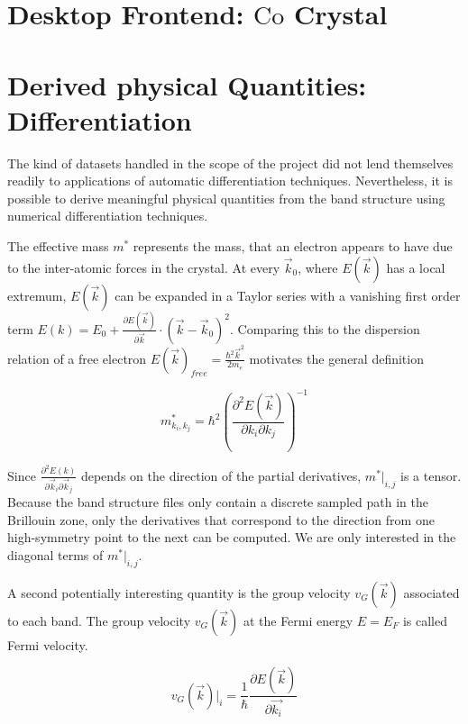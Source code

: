 \section{Desktop Frontend: $\textrm{Co}$ Crystal}



\section{Derived physical Quantities: Differentiation}
The kind of datasets handled in the scope of the project did not lend themselves
readily to applications of automatic differentiation techniques. Nevertheless,
it is possible to derive meaningful physical quantities from the band structure
using numerical differentiation techniques.

The effective mass $m^{*}$ represents the mass, that an electron appears to have due to the inter-atomic forces in the crystal. At every $\vec{k}_0$, where $E(\vec{k})$ has a local extremum, $E(\vec{k})$ can be expanded in a Taylor series with a vanishing first order term $E(k) = E_0 + \frac{\partial E(\vec{k})}{\partial \vec{k}} \cdot (\vec{k}-\vec{k}_0)^2$. Comparing this to the dispersion relation of a free electron $E(\vec{k})_{free} = \frac{\hbar^2 \vec{k}^2}{2 m_e}$ motivates the general definition 

\begin{equation}
    m^{*}_{k_i,k_j} = \hbar^2  \left(\frac{\partial^2E(\vec{k})}{\partial k_i \partial k_j}\right)^{-1}
\end{equation}

Since $\frac{\partial^2E(k)}{\partial \vec{k}_i \partial \vec{k}_j}$ depends on the direction of the partial derivatives, $m^{*}\big|_{i,j}$ is a tensor. Because the band structure files only contain a discrete sampled path in the Brillouin zone, only the derivatives that correspond to the direction from one high-symmetry point to the next can be computed. We are only interested in the diagonal terms of $m^{*}\big|_{i,j}$.



A second potentially interesting quantity is the group velocity $v_{G}(\vec{k})$ associated to each band. The group velocity $v_{G}(\vec{k})$ at the Fermi energy $E = E_F$ is called Fermi velocity.

\begin{equation}
    v_{G}(\vec{k})\big|_i = \frac{1}{\hbar}\frac{\partial E(\vec{k})}{\partial \vec{k_i}}
\end{equation}


